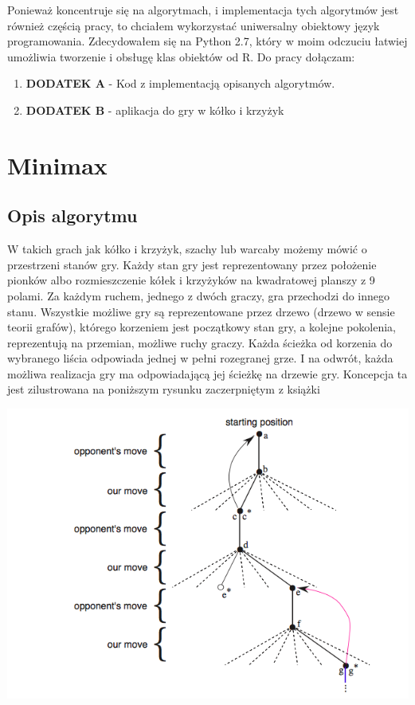 \documentclass[licencjacka]{pracamgr}
\begin{document}
Ponieważ koncentruje się na algorytmach, i implementacja tych algorytmów jest również częścią pracy, to chciałem wykorzystać uniwersalny obiektowy język programowania. Zdecydowałem się na Python 2.7, który w moim odczuciu łatwiej umożliwia tworzenie i obsługę klas obiektów od R.  Do pracy dołączam:
\begin{enumerate}
	\item \textbf{DODATEK A} - Kod z implementacją opisanych algorytmów.
	\item \textbf{DODATEK B}  - aplikacja do gry w kółko i krzyżyk
\end{enumerate}


\chapter{Minimax}\label{r:Minimax}


\section{Opis algorytmu}

W takich grach jak kółko i krzyżyk, szachy lub warcaby możemy mówić o przestrzeni stanów gry. Każdy stan  gry jest reprezentowany przez położenie pionków albo rozmieszczenie kółek i krzyżyków na kwadratowej planszy z 9 polami. Za każdym ruchem, jednego z dwóch graczy, gra przechodzi do innego stanu. Wszystkie możliwe gry są reprezentowane przez drzewo (drzewo w sensie teorii grafów), którego korzeniem jest początkowy stan gry, a kolejne pokolenia, reprezentują na przemian, możliwe ruchy graczy.  Każda ścieżka od korzenia do wybranego liścia  odpowiada jednej w pełni rozegranej grze. I na odwrót, każda możliwa realizacja gry ma odpowiadającą jej ścieżkę na drzewie gry.  Koncepcja ta  jest zilustrowana na poniższym rysunku zaczerpniętym z książki \cite{RL} \\
\begin{center}
	\includegraphics [scale=0.60] {game_tree.png}
\end{center}
\end{document}
